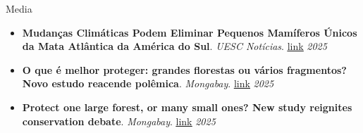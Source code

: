 \documentclass{resume}
\begin{document}
\begin{rSection}{Media}
\begin{itemize}
\item {\bf Mudanças Climáticas Podem Eliminar Pequenos Mamíferos Únicos da Mata Atlântica da América do Sul}. {\it UESC Notícias}. \href{https://www2.uesc.br/noticias/1296/Mudancas-Climaticas-Podem-Eliminar-Pequenos-Mamiferos-Unicos-da-Mata-Atlantica-da-America-do-Sul/}{\underline{link}} \hfill{\em 2025}
\item {\bf O que é melhor proteger: grandes florestas ou vários fragmentos? Novo estudo reacende polêmica}. {\it Mongabay}. \href{https://brasil.mongabay.com/2025/06/o-que-e-melhor-proteger-grandes-florestas-ou-varios-fragmentos-novo-estudo-reacende-polemica/}{\underline{link}} \hfill{\em 2025}
\item {\bf Protect one large forest, or many small ones? New study reignites conservation debate}. {\it Mongabay}. \href{https://news.mongabay.com/2025/06/protect-one-large-forest-or-many-small-ones-new-study-reignites-conservation-debate}{\underline{link}} \hfill{\em 2025}

\end{itemize} 


\end{rSection}
\end{document}
